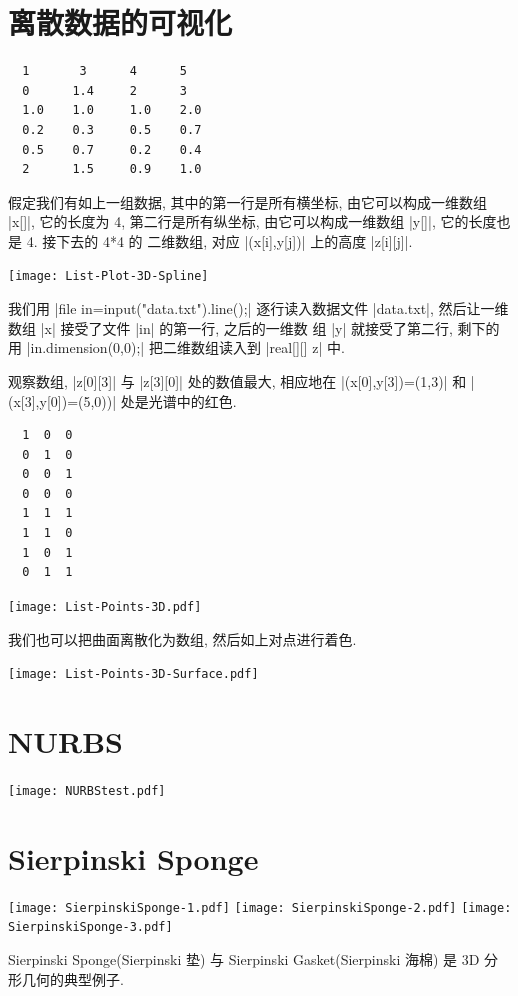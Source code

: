 \documentclass[nofonts,CJKnormalspaces]{ctexbook}
\begin{document}
\section{离散数据的可视化}
\begin{lstlisting}
  1       3      4      5
  0      1.4     2      3
  1.0    1.0     1.0    2.0
  0.2    0.3     0.5    0.7
  0.5    0.7     0.2    0.4
  2      1.5     0.9    1.0
\end{lstlisting}
假定我们有如上一组数据, 其中的第一行是所有横坐标, 由它可以构成一维数组
|x[]|, 它的长度为 4, 第二行是所有纵坐标, 由它可以构成一维数组 |y[]|,
它的长度也是 4. 接下去的 4*4 的 二维数组, 对应 |(x[i],y[j])| 上的高度
|z[i][j]|.
\begin{center}\texttt{[image: List-Plot-3D-Spline]}\end{center}%

我们用 |file in=input("data.txt").line();| 逐行读入数据文件
|data.txt|, 然后让一维数组 |x| 接受了文件 |in| 的第一行, 之后的一维数
组 |y| 就接受了第二行, 剩下的用 |in.dimension(0,0);| 把二维数组读入到
|real[][] z| 中.

观察数组, |z[0][3]| 与 |z[3][0]| 处的数值最大, 相应地在
|(x[0],y[3])=(1,3)| 和 |(x[3],y[0])=(5,0))| 处是光谱中的红色.

\begin{lstlisting}
  1  0  0
  0  1  0
  0  0  1
  0  0  0
  1  1  1
  1  1  0
  1  0  1
  0  1  1
\end{lstlisting}

\begin{center}\texttt{[image: List-Points-3D.pdf]}\end{center}%


我们也可以把曲面离散化为数组, 然后如上对点进行着色.
\begin{center}\texttt{[image: List-Points-3D-Surface.pdf]}\end{center}%


\section{NURBS}
\begin{center}\texttt{[image: NURBStest.pdf]}\end{center}%


\section{Sierpinski Sponge}
\begin{center}
  \texttt{[image: SierpinskiSponge-1.pdf]}
  \texttt{[image: SierpinskiSponge-2.pdf]}
  \texttt{[image: SierpinskiSponge-3.pdf]}
\end{center}%
Sierpinski Sponge(Sierpinski 垫) 与 Sierpinski Gasket(Sierpinski 海棉)
是 3D 分形几何的典型例子.
\end{document}
